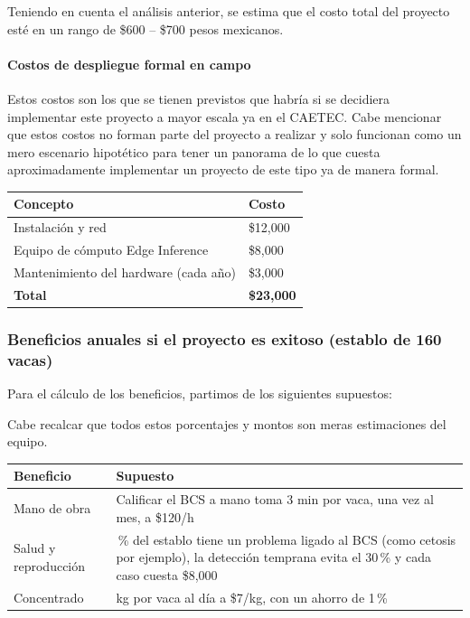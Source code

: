 \medskip
Teniendo en cuenta el análisis anterior, se estima que el costo total del proyecto esté en un rango de \$600 -- \$700 pesos mexicanos.

\paragraph{Costos de despliegue formal en campo}

Estos costos son los que se tienen previstos que habría si se decidiera implementar este proyecto a mayor escala ya en el CAETEC. Cabe mencionar que estos costos no forman parte del proyecto a realizar y solo funcionan como un mero escenario hipotético para tener un panorama de lo que cuesta aproximadamente implementar un proyecto de este tipo ya de manera formal.

\medskip
\noindent
\begin{tabularx}{\textwidth}{>{\raggedright\arraybackslash}X>{\raggedright\arraybackslash}p{}}
  \toprule
  Concepto & Costo \\
  \midrule
  Instalación y red & \$12,000 \\
  Equipo de cómputo Edge Inference & \$8,000 \\
  Mantenimiento del hardware (cada año) & \$3,000 \\
  \midrule
  \textbf{Total} & \textbf{\$23,000} \\
  \bottomrule
\end{tabularx}

\subsubsection{Beneficios anuales si el proyecto es exitoso (establo de 160 vacas)}

Para el cálculo de los beneficios, partimos de los siguientes supuestos:

Cabe recalcar que todos estos porcentajes y montos son meras estimaciones del equipo.

\medskip
\noindent
\begin{tabularx}{\textwidth}{>{\raggedright\arraybackslash}p{}>{\raggedright\arraybackslash}X}
  \toprule
  Beneficio & Supuesto \\
  \midrule
  Mano de obra & Calificar el BCS a mano toma 3 min por vaca, una vez al mes, a \$120/h \\
  \addlinespace
  Salud y reproducción & 5\,\% del establo tiene un problema ligado al BCS (como cetosis por ejemplo), la detección temprana evita el 30\,\% y cada caso cuesta \$8,000 \\
  \addlinespace
  Concentrado & 8 kg por vaca al día a \$7/kg, con un ahorro de 1\,\% \\
  \bottomrule
\end{tabularx}

